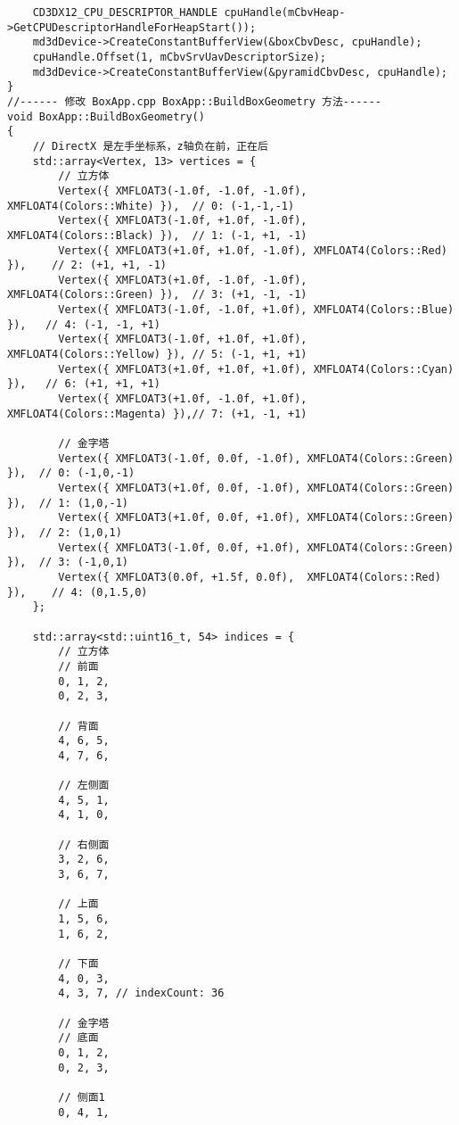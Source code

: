 \begin{lstlisting}
    CD3DX12_CPU_DESCRIPTOR_HANDLE cpuHandle(mCbvHeap->GetCPUDescriptorHandleForHeapStart());
    md3dDevice->CreateConstantBufferView(&boxCbvDesc, cpuHandle);
    cpuHandle.Offset(1, mCbvSrvUavDescriptorSize);
    md3dDevice->CreateConstantBufferView(&pyramidCbvDesc, cpuHandle);
}
//------ 修改 BoxApp.cpp BoxApp::BuildBoxGeometry 方法------
void BoxApp::BuildBoxGeometry()
{
    // DirectX 是左手坐标系，z轴负在前，正在后
    std::array<Vertex, 13> vertices = {
        // 立方体
        Vertex({ XMFLOAT3(-1.0f, -1.0f, -1.0f), XMFLOAT4(Colors::White) }),  // 0: (-1,-1,-1)
        Vertex({ XMFLOAT3(-1.0f, +1.0f, -1.0f), XMFLOAT4(Colors::Black) }),  // 1: (-1, +1, -1)
        Vertex({ XMFLOAT3(+1.0f, +1.0f, -1.0f), XMFLOAT4(Colors::Red) }),    // 2: (+1, +1, -1)
        Vertex({ XMFLOAT3(+1.0f, -1.0f, -1.0f), XMFLOAT4(Colors::Green) }),  // 3: (+1, -1, -1)
        Vertex({ XMFLOAT3(-1.0f, -1.0f, +1.0f), XMFLOAT4(Colors::Blue) }),   // 4: (-1, -1, +1)
        Vertex({ XMFLOAT3(-1.0f, +1.0f, +1.0f), XMFLOAT4(Colors::Yellow) }), // 5: (-1, +1, +1)
        Vertex({ XMFLOAT3(+1.0f, +1.0f, +1.0f), XMFLOAT4(Colors::Cyan) }),   // 6: (+1, +1, +1)
        Vertex({ XMFLOAT3(+1.0f, -1.0f, +1.0f), XMFLOAT4(Colors::Magenta) }),// 7: (+1, -1, +1)

        // 金字塔
        Vertex({ XMFLOAT3(-1.0f, 0.0f, -1.0f), XMFLOAT4(Colors::Green) }),  // 0: (-1,0,-1)
        Vertex({ XMFLOAT3(+1.0f, 0.0f, -1.0f), XMFLOAT4(Colors::Green) }),  // 1: (1,0,-1)
        Vertex({ XMFLOAT3(+1.0f, 0.0f, +1.0f), XMFLOAT4(Colors::Green) }),  // 2: (1,0,1)
        Vertex({ XMFLOAT3(-1.0f, 0.0f, +1.0f), XMFLOAT4(Colors::Green) }),  // 3: (-1,0,1)
        Vertex({ XMFLOAT3(0.0f, +1.5f, 0.0f),  XMFLOAT4(Colors::Red) }),    // 4: (0,1.5,0)
    };

    std::array<std::uint16_t, 54> indices = {
        // 立方体
        // 前面
        0, 1, 2,
        0, 2, 3,

        // 背面
        4, 6, 5,
        4, 7, 6,

        // 左侧面
        4, 5, 1,
        4, 1, 0,

        // 右侧面
        3, 2, 6,
        3, 6, 7,

        // 上面
        1, 5, 6,
        1, 6, 2,

        // 下面
        4, 0, 3,
        4, 3, 7, // indexCount: 36

        // 金字塔
        // 底面
        0, 1, 2, 
        0, 2, 3,

        // 侧面1
        0, 4, 1,


\end{lstlisting}
